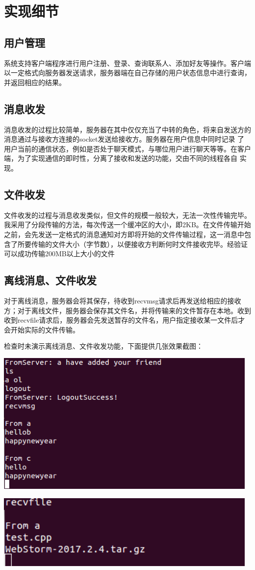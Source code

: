 \section{实现细节}
\subsection{用户管理}
系统支持客户端程序进行用户注册、登录、查询联系人、添加好友等操作。客户端以一定格式向服务器发送请求，服务器端在自己存储的用户状态信息中进行查询，并返回相应的结果。

\subsection{消息收发}
消息收发的过程比较简单，服务器在其中仅仅充当了中转的角色，将来自发送方的消息通过与接收方连接的socket发送给接收方。服务器在用户信息中同时记录
了用户当前的通信状态，例如是否处于聊天模式，与哪位用户进行聊天等等。在客户端，为了实现通信的即时性，分离了接收和发送的功能，交由不同的线程各自
实现。

\subsection{文件收发}
文件收发的过程与消息收发类似，但文件的规模一般较大，无法一次性传输完毕。我采用了分段传输的方法，每次传送一个缓冲区的大小，即2KB。在文件传输开始
之前，会先发送一定格式的消息通知对方即将开始的文件传输过程，这一消息中包含了所要传输的文件大小（字节数），以便接收方判断何时文件接收完毕。经验证
可以成功传输200MB以上大小的文件

\subsection{离线消息、文件收发}
对于离线消息，服务器会将其保存，待收到recvmsg请求后再发送给相应的接收方；对于离线文件，服务器会保存其文件名，并将传输来的文件暂存在本地。收到
收到recvfile请求后，服务器会先发送暂存的文件名，用户指定接收某一文件后才会开始实际的文件传输。

检查时未演示离线消息、文件收发功能，下面提供几张效果截图：

\begin{center}
    \includegraphics[width=13cm]{image/recvmsg.png}
\end{center}

\begin{center}
    \includegraphics[width=13cm]{image/recvfile.png}
\end{center}
